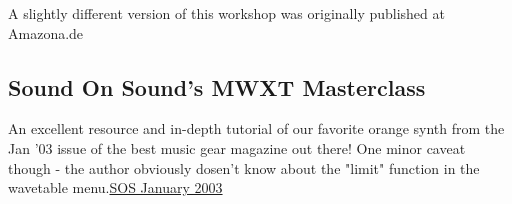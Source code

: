 	A slightly different version of this workshop was originally published at Amazona.de
\subsection{Sound On Sound's MWXT Masterclass}
An excellent resource and in-depth tutorial of our favorite orange synth from the Jan '03 issue of the best music gear magazine out there! One minor caveat though - the author obviously dosen't know about the "limit" function in the wavetable menu.\href{https://www.soundonsound.com/techniques/getting-creative-waldorf-microwave-synths}{SOS January 2003}\\